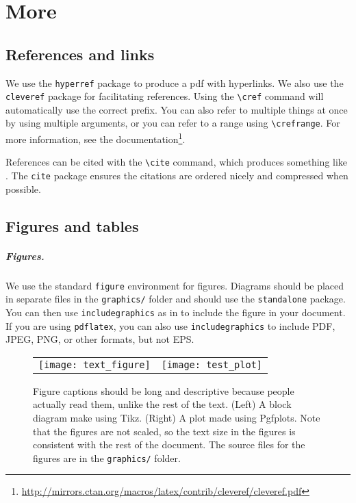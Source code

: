 \chapter{More}

\section{References and links}
\label{sec:references}

We use the \verb|hyperref| package to produce a pdf with hyperlinks. We also use the \verb|cleveref| package for facilitating references. Using the \verb|\cref| command will automatically use the correct prefix. You can also refer to multiple things at once by using multiple arguments, or you can refer to a range using \verb|\crefrange|. For more information, see the documentation\footnote{\url{http://mirrors.ctan.org/macros/latex/contrib/cleveref/cleveref.pdf}}.

References can be cited with the \verb|\cite| command, which produces something like \cite{lessard16,lessard2015optimal,sundararajan2020analysis,tmm}. The \verb|cite| package ensures the citations are ordered nicely and compressed when possible.


\section{Figures and tables}

\paragraph{Figures.}
We use the standard \verb|figure| environment for figures. Diagrams should be placed in separate files in the \texttt{graphics/} folder and should use the \texttt{standalone} package. You can then use \verb|includegraphics| as in  to include the figure in your document. If you are using \verb|pdflatex|, you can also use \verb|includegraphics| to include PDF, JPEG, PNG, or other formats, but not EPS.

\begin{figure}[htb]
	\centering
	\begin{tabular}{cc}
		\texttt{[image: text\_figure]} & \texttt{[image: test\_plot]}
	\end{tabular}
	\caption{Figure captions should be long and descriptive because people actually read them, unlike the rest of the text. (Left) A block diagram make using Tikz. (Right) A plot made using Pgfplots. Note that the figures are not scaled, so the text size in the figures is consistent with the rest of the document. The source files for the figures are in the \texttt{graphics/} folder.}
  \label{fig:sample}
\end{figure}

